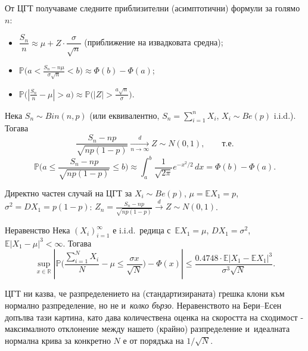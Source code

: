 \begin{rembox}[Полезни следствия (означаваме \texorpdfstring{$\Phi(x)=\mathbb P(Z<x)$}{Ф(x)=P(Z<x)} за \texorpdfstring{$Z\sim N(0,1)$}{Z~N(0,1)})]
От ЦГТ получаваме следните приблизителни (асимптотични) формули за
голямо $n$:
\begin{itemize}[nosep]
  \item $\dfrac{S_n}{n} \approx \mu + Z\cdot\dfrac{\sigma}{\sqrt n}$ (приближение на извадковата средна);
  \item $\mathbb P\big(a < \tfrac{S_n-n\mu}{\sigma\sqrt n} < b\big) \approx \Phi(b)-\Phi(a)$;
  \item $\mathbb P\big(|\tfrac{S_n}n-\mu|>a\big) \approx \mathbb P\big(|Z|>\tfrac{a\sqrt n}{\sigma}\big)$.
\end{itemize}
\end{rembox}

\begin{corbox}
Нека $S_n\sim Bin(n,p)$ (или еквивалентно, $S_n=\sum_{i=1}^n X_i$,
$X_i\sim Be(p)$ i.i.d.). Тогава
\[
  \frac{S_n-np}{\sqrt{np(1-p)}} \xrightarrow[n\to\infty]{d} Z\sim N(0,1),
  \qquad\text{т.е.}
\]
\[
  \mathbb P\Big(a\le\frac{S_n-np}{\sqrt{np(1-p)}}\le b\Big) \approx \int_a^b \frac1{\sqrt{2\pi}}e^{-x^2/2}\,dx = \Phi(b)-\Phi(a).
\]
\end{corbox}

\begin{proofbox}
Директно частен случай на ЦГТ за $X_i\sim Be(p)$, $\mu=\mathbb EX_1
=p$, $\sigma^2=DX_1=p(1-p)$: $Z_n=\tfrac{S_n-np}{\sqrt{np(1-p)}}
\xrightarrow{d}Z\sim N(0,1)$. \qedbg
\end{proofbox}

\begin{thmbox}{Неравенство}
Нека $(X_i)_{i=1}^{\infty}$ е i.i.d.\ редица с~$\mathbb EX_1=\mu$,
$DX_1=\sigma^2$, $\mathbb E|X_1-\mu|^3<\infty$. Тогава
\[
  \sup_{x\in\mathbb R} \left|\mathbb P\Big(\frac{\sum_{i=1}^N X_i}{N}-\mu \le \frac{\sigma x}{\sqrt N}\Big) - \Phi(x)\right| \le \frac{0.4748\cdot\mathbb E|X_1-\mathbb EX_1|^3}{\sigma^3\sqrt N}.
\]
\end{thmbox}

\begin{rembox}[Забележка]
ЦГТ ни казва, че разпределението на (стандартизираната) грешка клони
към нормално разпределение, но не и~\emph{колко бързо}. Неравенството
на Бери--Есен допълва тази картина, като дава количествена оценка на
скоростта на сходимост - максималното отклонение между нашето
(крайно) разпределение и~идеалната нормална крива за конкретно $N$ е
от порядъка на $1/\sqrt N$.
\end{rembox}

